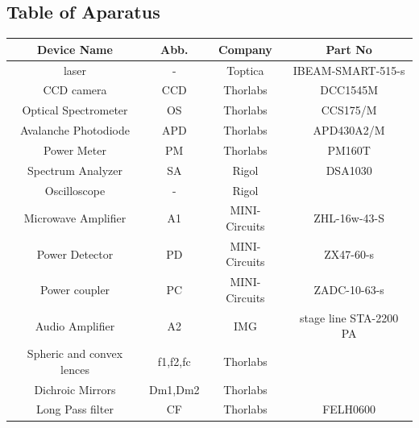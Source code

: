  \subsection{Table of Aparatus}
 
 \begin{tabular}{|c|c|c|c|}
 	\hline 
 	Device Name & Abb. & Company & Part No \\ 
 	\hline 
 	laser & - & Toptica & IBEAM-SMART-515-s  \\ 
 	\hline 
 	CCD camera & CCD & Thorlabs &  DCC1545M\\ 
 	\hline 
 	Optical Spectrometer & OS & Thorlabs & CCS175/M \\ 
 	\hline 
 	Avalanche Photodiode & APD & Thorlabs & APD430A2/M \\ 
 	\hline 
 	Power Meter & PM & Thorlabs & PM160T \\ 
 	\hline 
 	Spectrum Analyzer & SA & Rigol & DSA1030 \\ 
 	\hline 
 	Oscilloscope & - & Rigol &  \\ 
 	\hline 
 	Microwave Amplifier & A1 & MINI-Circuits & ZHL-16w-43-S \\ 
 	\hline 
 	Power Detector & PD &MINI-Circuits  & ZX47-60-s  \\ 
 	\hline 
 	Power coupler  & PC &MINI-Circuits  & ZADC-10-63-s \\ 
 	\hline 
 	Audio Amplifier & A2 & IMG &  stage line STA-2200 PA \\ 
 	\hline 
 	Spheric and convex lences & f1,f2,fc & Thorlabs  &  \\ 
 	\hline 
 	Dichroic Mirrors & Dm1,Dm2 & Thorlabs &  \\ 
 	\hline 
 		Long Pass filter & CF & Thorlabs & FELH0600  \\ 
 	\hline 
 \end{tabular} 